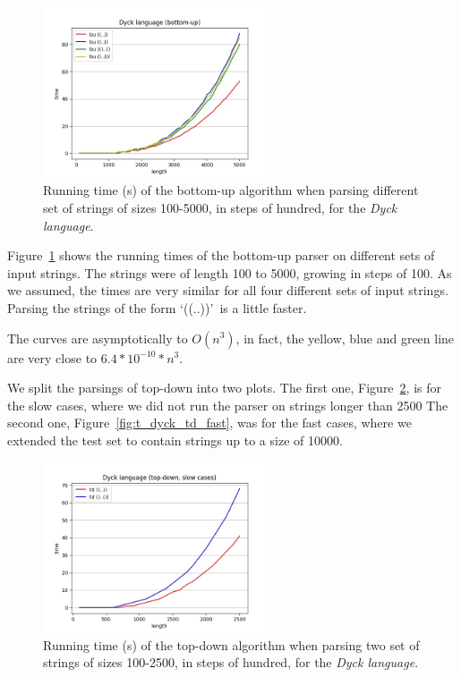 \begin{figure}[!ht]
    \centering
    \includegraphics[width=0.6\textwidth]{Resources/t_dyck_bu.jpg}
    \caption{Running time (s) of the bottom-up algorithm when parsing different set of strings of sizes 100-5000, in steps of hundred, for the \textit{Dyck language}.}
    \label{fig:t_dyck_bu}
\end{figure}

Figure~\ref{fig:t_dyck_bu} shows the running times of the bottom-up parser on different sets of input strings.
The strings were of length 100 to 5000, growing in steps of 100.
As we assumed, the times are very similar for all four different sets of input strings.
Parsing the strings of the form \lq((..))\rq~is a little faster.

The curves are asymptotically to $O(n^3)$, in fact, the yellow, blue and green line are very close to $6.4*10^{-10}*n^3$.

We split the parsings of top-down into two plots.
The first one, Figure~\ref{fig:t_dyck_td_slow}, is for the slow cases, where we did not run the parser on strings longer than 2500
The second one, Figure~\ref{fig:t_dyck_td_fast}, was for the fast cases, where we extended the test set to contain strings up to a size of 10000.

\begin{figure}[h!]
    \centering
    \includegraphics[width=0.6\textwidth]{Resources/t_dyck_td_slow.jpg}
    \caption{Running time (s) of the top-down algorithm when parsing two set of strings of sizes 100-2500, in steps of hundred, for the \textit{Dyck language}.}
    \label{fig:t_dyck_td_slow}
\end{figure}

